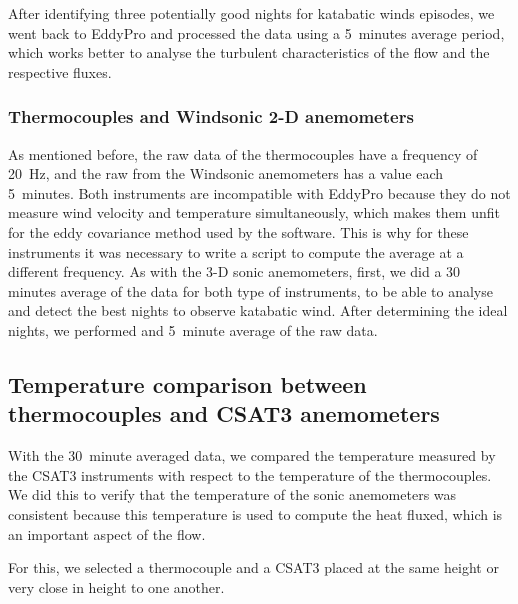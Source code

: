 After identifying three potentially good nights for katabatic winds episodes, we went back to EddyPro and processed the data using a 5~minutes average period, which works better to analyse the turbulent characteristics of the flow and the respective fluxes. 

\subsubsection{Thermocouples and Windsonic 2-D anemometers}

As mentioned before, the raw data of the thermocouples have a frequency of 20~Hz, and the raw from the Windsonic anemometers has a value each 5~minutes. Both instruments are incompatible with EddyPro because they do not measure wind velocity and temperature simultaneously, which makes them unfit for the eddy covariance method used by the software. This is why for these instruments it was necessary to write a script to compute the average at a different frequency. As with the 3-D sonic anemometers, first, we did a 30 minutes average of the data for both type of instruments, to be able to analyse and detect the best nights to observe katabatic wind. After determining the ideal nights, we performed and 5~minute average of the raw data.

\subsection{Temperature comparison between thermocouples and CSAT3 anemometers}

With the 30~minute averaged data, we compared the temperature measured by the CSAT3 instruments with respect to the temperature of the thermocouples. We did this to verify that the temperature of the sonic anemometers was consistent because this temperature is used to compute the heat fluxed, which is an important aspect of the flow. 

For this, we selected a thermocouple and a CSAT3 placed at the same height or very close in height to one another. 
